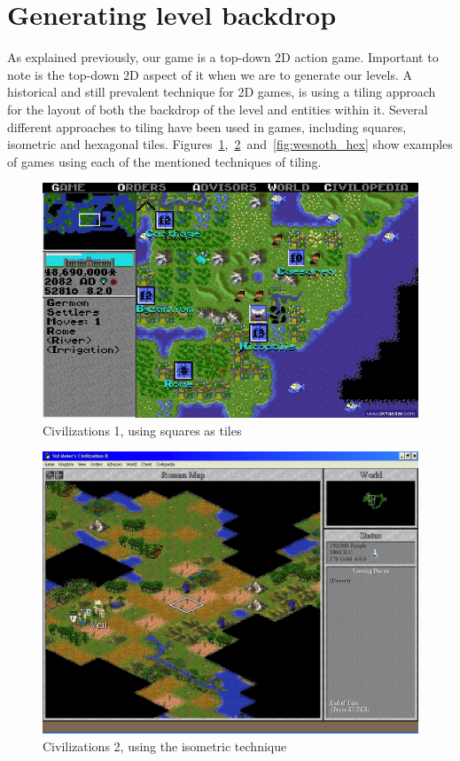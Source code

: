 \section{Generating level backdrop}
As explained previously, our game is a top-down 2D action game. Important to
note is the top-down 2D aspect of it when we are to generate our levels.
A historical and still prevalent technique for 2D games, is using a
tiling approach for the layout of both the backdrop of the level and entities
within it. Several different approaches to tiling have been used in games,
including squares, isometric and hexagonal tiles.
Figures~\ref{fig:civ-1_square},~\ref{fig:civ-2_iso}~and~\ref{fig:wesnoth_hex}
show examples of games using each of the mentioned techniques of
tiling.

\begin{figure}[H]
    \centering
    \includegraphics[scale=0.4]{figures/generating_levels/civ-1_square.png}
    \caption{Civilizations 1, using squares as tiles}\label{fig:civ-1_square} 
\end{figure}

\begin{figure}[H]
    \centering
    \includegraphics[scale=0.4]{figures/generating_levels/civ-2_iso.png}
    \caption{Civilizations 2, using the isometric technique}\label{fig:civ-2_iso} 
\end{figure}

